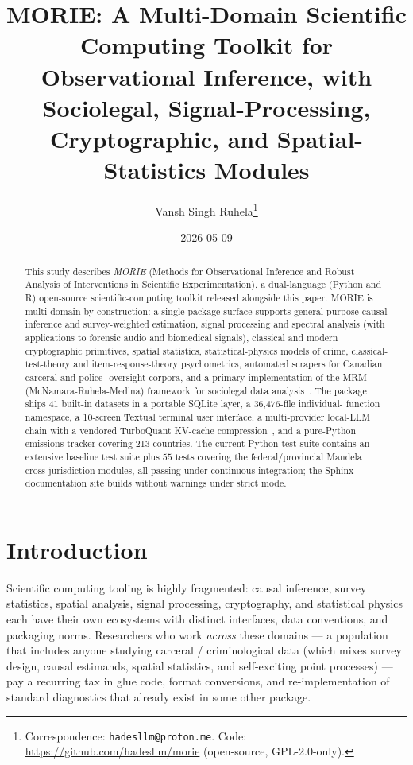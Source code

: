 \documentclass[11pt,a4paper]{article}
\title{MORIE: A Multi-Domain Scientific Computing Toolkit
       for Observational Inference, with Sociolegal,
       Signal-Processing, Cryptographic, and Spatial-Statistics
       Modules}
\author{Vansh Singh Ruhela\thanks{%
  Correspondence: \texttt{hadesllm@proton.me}.
  Code: \url{https://github.com/hadesllm/morie}
  (open-source, GPL-2.0-only).}}
\date{2026-05-09}
\theoremstyle{plain}
\theoremstyle{definition}
\theoremstyle{remark}
\begin{document}
\maketitle

\begin{abstract}
This study describes \emph{MORIE} (Methods for Observational Inference and
Robust Analysis of Interventions in Scientific Experimentation), a
dual-language (Python and R) open-source scientific-computing
toolkit released alongside this paper. MORIE is multi-domain by
construction: a single package surface supports general-purpose
causal inference and survey-weighted estimation, signal processing
and spectral analysis (with applications to forensic audio and
biomedical signals), classical and modern cryptographic
primitives, spatial statistics, statistical-physics models of
crime, classical-test-theory and item-response-theory
psychometrics, automated scrapers for Canadian carceral and police-
oversight corpora, and a primary implementation of the MRM
(McNamara-Ruhela-Medina) framework for sociolegal data
analysis~\cite{Ruhela2026MRM}. The package ships 41 built-in
datasets in a portable SQLite layer, a 36{,}476-file individual-
function namespace, a 10-screen Textual terminal user interface, a
multi-provider local-LLM chain with a vendored TurboQuant
KV-cache compression~\cite{Zandieh2026TurboQuant}, and a pure-Python
emissions tracker covering 213 countries. The current Python test
suite contains an extensive baseline test suite plus $55$ tests
covering the federal/provincial Mandela cross-jurisdiction modules,
all passing under continuous integration; the Sphinx documentation
site builds without warnings under strict mode.
\end{abstract}

\section{Introduction}
\label{sec:intro}

Scientific computing tooling is highly fragmented: causal inference,
survey statistics, spatial analysis, signal processing,
cryptography, and statistical physics each have their own ecosystems
with distinct interfaces, data conventions, and packaging norms.
Researchers who work \emph{across} these domains --- a population
that includes anyone studying carceral / criminological data
(which mixes survey design, causal estimands, spatial statistics,
and self-exciting point processes) --- pay a recurring tax in glue
code, format conversions, and re-implementation of standard
diagnostics that already exist in some other package.
\end{document}
